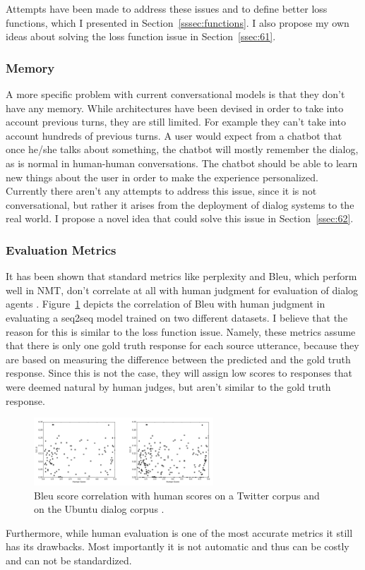 \documentclass[12pt]{article}
\begin{document}
Attempts have been made to address these issues and to define better loss functions, which I presented in Section~\ref{sssec:functions}. I also propose my own ideas about solving the loss function issue in Section~\ref{ssec:61}.

\subsubsection{Memory} \label{sssec:memory}
A more specific problem with current conversational models is that they don't have any memory. While architectures have been devised in order to take into account previous turns, they are still limited. For example they can't take into account hundreds of previous turns. A user would expect from a chatbot that once he/she talks about something, the chatbot will mostly remember the dialog, as is normal in human-human conversations. The chatbot should be able to learn new things about the user in order to make the experience personalized. Currently there aren't any attempts to address this issue, since it is not conversational, but rather it arises from the deployment of dialog systems to the real world. I propose a novel idea that could solve this issue in Section~\ref{ssec:62}.

\subsubsection{Evaluation Metrics} \label{sssec:metrics}
It has been shown that standard metrics like perplexity and Bleu, which perform well in NMT, don't correlate at all with human judgment for evaluation of dialog agents \cite{Tao:2017,Liu:2016}. Figure~\ref{fig:bleu} depicts the correlation of Bleu with human judgment in evaluating a seq2seq model trained on two different datasets. I believe that the reason for this is similar to the loss function issue. Namely, these metrics assume that there is only one gold truth response for each source utterance, because they are based on measuring the difference between the predicted and the gold truth response. Since this is not the case, they will assign low scores to responses that were deemed natural by human judges, but aren't similar to the gold truth response.
\begin{figure}[H]
	\centering
	\includegraphics[width=0.6\textwidth]{pics/bleu.png}
	\caption{Bleu score correlation with human scores \cite{Liu:2016} on a Twitter corpus and on the Ubuntu dialog corpus \cite{Lowe:2015}.}
	\label{fig:bleu}
\end{figure}
Furthermore, while human evaluation is one of the most accurate metrics it still has its drawbacks. Most importantly it is not automatic and thus can be costly and can not be standardized.
\end{document}
